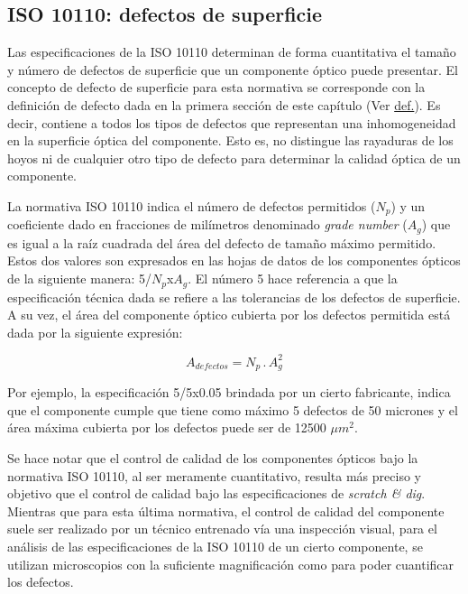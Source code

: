 \singlespacing
\subsection{ISO 10110: defectos de superficie}


\hspace{0.5cm}Las especificaciones de la ISO 10110 determinan de forma cuantitativa el tamaño y número de defectos de superficie que un componente óptico puede presentar. El concepto de defecto de superficie para esta normativa se corresponde con la definición de defecto dada en la primera sección de este capítulo (Ver \hyperref[sec:defectsurf]{def.}). Es decir, contiene a todos los tipos de defectos que representan una inhomogeneidad en la superficie óptica del componente. Esto es, no distingue las rayaduras de los hoyos ni de cualquier otro tipo de defecto para determinar la calidad óptica de un componente.

La normativa ISO 10110 indica el número de defectos permitidos ($N_{p}$) y un coeficiente dado en fracciones de milímetros denominado \textit{grade number} ($A_{g}$) que es igual a la raíz cuadrada del área del defecto de tamaño máximo permitido. Estos dos valores son expresados en las hojas de datos de los componentes ópticos de la siguiente manera: 5/$N_{p}$x$A_{g}$. El número 5 hace referencia a que la especificación técnica dada se refiere a las tolerancias de los defectos de superficie. A su vez, el área del componente óptico cubierta por los defectos permitida está dada por la siguiente expresión:

\begin{equation}
A_{defectos} = N_{p}\hspace{2pt} .\hspace{2pt} A_{g}^{2}
\end{equation}

Por ejemplo, la especificación 5/5x0.05 brindada por un cierto fabricante, indica que el componente cumple que tiene como máximo 5 defectos de 50 micrones y el área máxima cubierta por los defectos puede ser de 12500 $\mu m^{2}$.

Se hace notar que el control de calidad de los componentes ópticos bajo la normativa ISO 10110, al ser meramente cuantitativo, resulta más preciso y objetivo que el control de calidad bajo las especificaciones de \textit{scratch \& dig}. Mientras que para esta última normativa, el control de calidad del componente suele ser realizado por un técnico entrenado vía una inspección visual, para el análisis de las especificaciones de la ISO 10110 de un cierto componente, se utilizan microscopios con la suficiente magnificación como para poder cuantificar los defectos.

